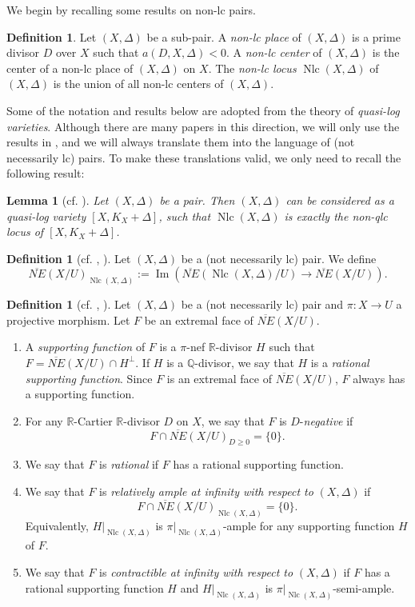 \documentclass[11pt]{amsart}
\numberwithin{equation}{section}
\newcommand{\Qq}{\mathbb{Q}}
\newcommand{\Rr}{\mathbb{R}}
\newcommand{\Ima}{\operatorname{Im}}
\newcommand{\Nlc}{\operatorname{Nlc}}
\newtheorem{lem}[thm]{Lemma}
\theoremstyle{definition}
\newtheorem{defn}[thm]{Definition}
\theoremstyle{definition}
\theoremstyle{definition}
\begin{document}
We begin by recalling some results on non-lc pairs. 

\begin{defn}
Let $(X,\Delta)$ be a sub-pair. A \emph{non-lc place} of $(X,\Delta)$ is a prime divisor $D$ over $X$ such that $a(D,X,\Delta)<0$. A \emph{non-lc center} of $(X,\Delta)$ is the center of a non-lc place of $(X,\Delta)$ on $X$. The \emph{non-lc locus} $\Nlc(X,\Delta)$ of $(X,\Delta)$ is the union of all non-lc centers of $(X,\Delta)$. 
\end{defn}

Some of the notation and results below are adopted from the theory of \emph{quasi-log varieties}. Although there are many papers in this direction, we will only use the results in \cite{Amb03,Fuj11}, and we will always translate them into the language of (not necessarily lc) pairs. To make these translations valid, we only need to recall the following result:
\begin{lem}[cf. {\cite[Example 4.3.1]{Amb03}}]
Let $(X,\Delta)$ be a pair. Then $(X,\Delta)$ can be considered as a quasi-log variety $[X,K_X+\Delta]$, such that $\Nlc(X,\Delta)$ is exactly the non-qlc locus of $[X,K_X+\Delta]$.
\end{lem}

\begin{defn}[cf. {\cite[Definition 5.2]{Amb03}, \cite[Theorem 4.5.2(1), Definition 6.7.1]{Fuj11}}]
Let $(X,\Delta)$ be a (not necessarily lc) pair. We define
$$\overline{NE}(X/U)_{\Nlc(X,\Delta)}:=\Ima(\overline{NE}(\Nlc(X,\Delta)/U)\rightarrow\overline{NE}(X/U)).$$
\end{defn}

\begin{defn}[{cf. \cite[Definition 5.3]{Amb03}, \cite[Definition 6.7.2]{Fuj11}}]
Let $(X,\Delta)$ be a (not necessarily lc) pair and $\pi: X\rightarrow U$ a projective morphism. Let $F$ be an extremal face of $\overline{NE}(X/U)$.
\begin{enumerate}
\item A \emph{supporting function} of $F$ is a  $\pi$-nef $\Rr$-divisor $H$ such that $F=\overline{NE}(X/U)\cap H^{\bot}$. If $H$ is a $\Qq$-divisor, we say that $H$ is a \emph{rational supporting function}. Since $F$ is an extremal face of $\overline{NE}(X/U)$, $F$ always has a supporting function.
    \item For any $\Rr$-Cartier $\Rr$-divisor $D$ on $X$, we say that $F$ is $D$-\emph{negative} if $$F\cap\overline{NE}(X/U)_{D\geq 0}=\{0\}.$$
    \item We say that $F$ is \emph{rational} if $F$ has a rational supporting function.
    \item We say that $F$ is \emph{relatively ample at infinity with respect to} $(X,\Delta)$  if $$F\cap\overline{NE}(X/U)_{\Nlc(X,\Delta)}=\{0\}.$$ Equivalently, $H|_{\Nlc(X,\Delta)}$ is $\pi|_{\Nlc(X,\Delta)}$-ample for any supporting function $H$ of $F$.
    \item We say that $F$ is \emph{contractible at infinity with respect to} $(X,\Delta)$ if $F$ has a rational supporting function $H$ and $H|_{\Nlc(X,\Delta)}$ is $\pi|_{\Nlc(X,\Delta)}$-semi-ample.
\end{enumerate}
\end{defn}
\end{document}
